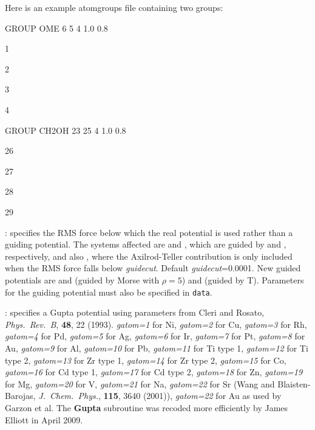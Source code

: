 Here is an example {\textrm atomgroups} file containing two groups:

{\textrm GROUP OME 6 5 4 1.0 0.8}

{\textrm 1}

{\textrm 2}

{\textrm 3}

{\textrm 4}

{\textrm GROUP CH2OH 23 25 4 1.0 0.8}

{\textrm 26}

{\textrm 27}

{\textrm 28}

{\textrm 29}

: specifies the RMS force below which the real potential is used
rather than a guiding potential. The systems affected are {\/} and {},
which are guided by {\/} and {\/}, respectively, and also {\/},
where the Axilrod-Teller contribution is only included when the RMS force falls below
{\it guidecut\/}. Default {\it guidecut\/}=0.0001.
New guided potentials are {} and {} (guided by Morse with $\rho=5$) and
{} (guided by {T}). Parameters for the guiding potential must also be specified in
{\tt data}.

: specifies a Gupta potential using parameters from Cleri and Rosato,
{\it Phys.~Rev.~B}, {\bf 48}, 22 (1993). {\it gatom=1} for Ni, 
{\it gatom=2} for Cu,
{\it gatom=3} for Rh,
{\it gatom=4} for Pd,
{\it gatom=5} for Ag,
{\it gatom=6} for Ir,
{\it gatom=7} for Pt,
{\it gatom=8} for Au,
{\it gatom=9} for Al,
{\it gatom=10} for Pb,
{\it gatom=11} for Ti type 1,
{\it gatom=12} for Ti type 2,
{\it gatom=13} for Zr type 1,
{\it gatom=14} for Zr type 2,
{\it gatom=15} for Co,
{\it gatom=16} for Cd type 1,
{\it gatom=17} for Cd type 2,
{\it gatom=18} for Zn,
{\it gatom=19} for Mg,
{\it gatom=20} for V,
{\it gatom=21} for Na,
{\it gatom=22} for Sr (Wang  and Blaisten-Barojas, {\it J.~Chem.~Phys.}, {\bf 115}, 3640 (2001)),
{\it gatom=22} for Au as used by Garzon et al.
The {\bf Gupta} subroutine was recoded more efficiently by James Elliott in April 2009.


